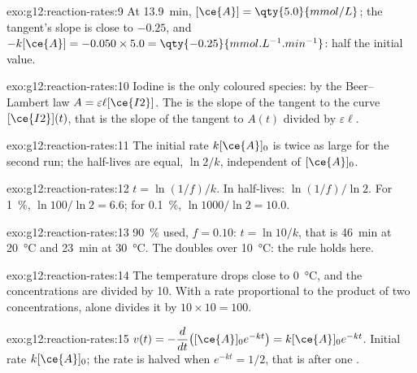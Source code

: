 \begin{solution}{exo:g12:reaction-rates:9}
At \qty{13.9}{min}, $[\ce{A}] = \qty{5.0}{mmol/L}$; the tangent's slope is
close to $-0.25$, and $-k[\ce{A}] = -0.050 \times 5.0 =
\qty{-0.25}{mmol.L^{-1}.min^{-1}}$: half the initial value.
\end{solution}

\begin{solution}{exo:g12:reaction-rates:10}
Iodine is the only coloured species: by the Beer--Lambert law
$A = \varepsilon \ell [\ce{I2}]$. The  is the slope of
the tangent to the curve $[\ce{I2}](t)$, that is the slope of the
tangent to $A(t)$ divided by $\varepsilon \ell$.
\end{solution}

\begin{solution}{exo:g12:reaction-rates:11}
The initial rate $k[\ce{A}]_0$ is twice as large for the second run; the
half-lives are equal, $\ln 2 / k$, independent of $[\ce{A}]_0$.
\end{solution}

\begin{solution}{exo:g12:reaction-rates:12}
$t = \ln(1/f)/k$. In half-lives: $\ln(1/f)/\ln 2$. For \qty{1}{\percent},
$\ln 100 / \ln 2 = 6.6$; for \qty{0.1}{\percent}, $\ln 1000 / \ln 2 =
10.0$.
\end{solution}

\begin{solution}{exo:g12:reaction-rates:13}
\qty{90}{\percent} used, $f = 0.10$: $t = \ln 10 / k$, that is
\qty{46}{min} at \qty{20}{\celsius} and \qty{23}{min} at \qty{30}{\celsius}.
The  doubles over \qty{10}{\celsius}: the rule holds here.
\end{solution}

\begin{solution}{exo:g12:reaction-rates:14}
The temperature drops close to \qty{0}{\celsius}, and the concentrations
are divided by 10. With a rate proportional to the product of two
concentrations,  alone divides it by $10 \times 10 = 100$.
\end{solution}

\begin{solution}{exo:g12:reaction-rates:15}
$v(t) = -\dfrac{d}{dt}\big([\ce{A}]_0 e^{-kt}\big) = k[\ce{A}]_0 e^{-kt}$.
Initial rate $k[\ce{A}]_0$; the rate is halved when $e^{-kt} = 1/2$, that
is after one .
\end{solution}


